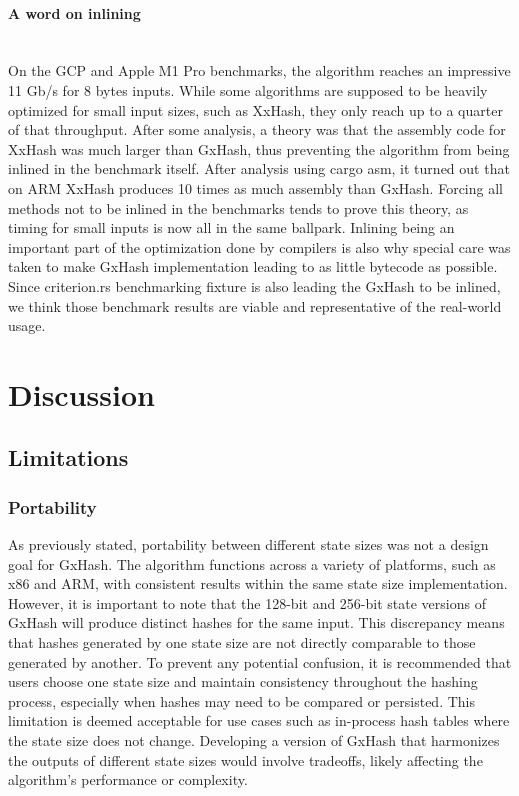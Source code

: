 \documentclass[10pt]{article}
\begin{document}
\paragraph{A word on inlining}\leavevmode\\
On the GCP and Apple M1 Pro benchmarks, the algorithm reaches an impressive 11 Gb/s for 8 bytes inputs. While some algorithms are supposed to be heavily optimized for small input sizes, such as XxHash, they only reach up to a quarter of that throughput. After some analysis, a theory was that the assembly code for XxHash was much larger than GxHash, thus preventing the algorithm from being inlined in the benchmark itself. After analysis using cargo asm, it turned out that on ARM XxHash produces 10 times as much assembly than GxHash. Forcing all methods not to be inlined in the benchmarks tends to prove this theory, as timing for small inputs is now all in the same ballpark. Inlining being an important part of the optimization done by compilers is also why special care was taken to make GxHash implementation leading to as little bytecode as possible. Since criterion.rs benchmarking fixture is also leading the GxHash to be inlined, we think those benchmark results are viable and representative of the real-world usage.

\section{Discussion}
\subsection{Limitations}

\subsubsection{Portability}
As previously stated, portability between different state sizes was not a design goal for GxHash. The algorithm functions across a variety of platforms, such as x86 and ARM, with consistent results within the same state size implementation. However, it is important to note that the 128-bit and 256-bit state versions of GxHash will produce distinct hashes for the same input. This discrepancy means that hashes generated by one state size are not directly comparable to those generated by another. To prevent any potential confusion, it is recommended that users choose one state size and maintain consistency throughout the hashing process, especially when hashes may need to be compared or persisted. This limitation is deemed acceptable for use cases such as in-process hash tables where the state size does not change. Developing a version of GxHash that harmonizes the outputs of different state sizes would involve tradeoffs, likely affecting the algorithm's performance or complexity.
\end{document}
